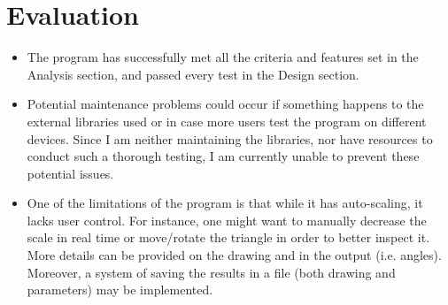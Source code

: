 \documentclass{article}
\begin{document}
\section{Evaluation}
\begin{itemize}
    \item The program has successfully met all the criteria and features set in
        the Analysis section, and passed every test in the Design section.
    \item Potential maintenance problems could occur if something happens to
        the external libraries used or in case more users test the program on
        different devices. Since I am neither maintaining the libraries, nor
        have resources to conduct such a thorough testing, I am currently
        unable to prevent these potential issues.
    \item One of the limitations of the program is that while it has
        auto-scaling, it lacks user control. For instance, one might want to
        manually decrease the scale in real time or move/rotate the triangle in
        order to better inspect it. More details can be provided on the drawing
        and in the output (i.e. angles).  Moreover, a system of saving the
        results in a file (both drawing and parameters) may be implemented.
\end{itemize}
\end{document}
